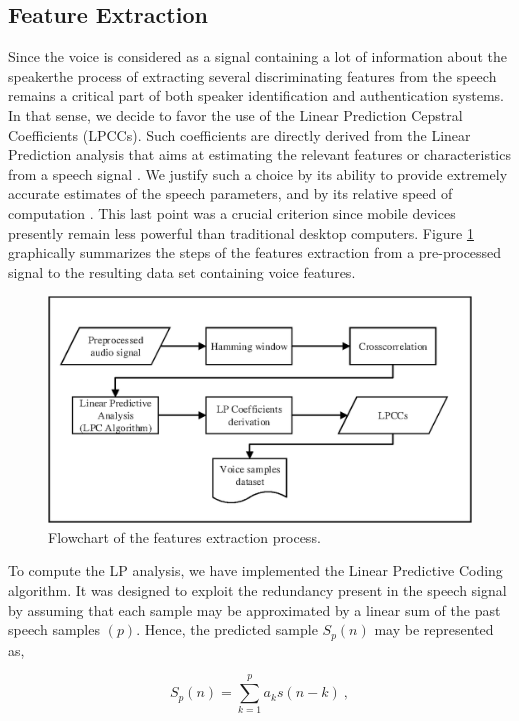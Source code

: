 \documentclass[cryptography,article,submit,moreauthors,pdftex,10pt,a4paper]{mdpi}
\begin{document}
\subsection{Feature Extraction}

Since the voice is considered as a signal containing a lot of information about the speaker\textemdash the process of extracting several discriminating features from the speech remains a critical part of both speaker identification and authentication systems. In that sense, we decide to favor the use of the Linear Prediction Cepstral Coefficients (LPCCs). Such coefficients are directly derived from the Linear Prediction analysis that aims at estimating the relevant features or characteristics from a speech signal \cite{28}. We justify such a choice by its ability to provide extremely accurate estimates of the speech parameters, and by its relative speed of computation \cite{22}. This last point was a crucial criterion since mobile devices presently remain less powerful than traditional desktop computers. Figure \ref{fig:4} graphically summarizes the steps of the features extraction from a pre-processed signal to the resulting data set containing voice features.

\begin{figure}[H]
	\centering
	\includegraphics[width=10 cm]{4.eps}
	\caption{Flowchart of the features extraction process.}
	\label{fig:4}
\end{figure}

To compute the LP analysis, we have implemented the Linear Predictive Coding algorithm. It was designed to exploit the redundancy present in the speech signal by assuming that each sample may be approximated by a linear sum of the past speech samples $(p)$. Hence, the predicted sample $S_p (n)$ may be represented as,

\begin{equation}
\label{eq:3}
  S_p(n) = \sum\limits_{k=1}^{p}a_ks(n-k)~,
\end{equation}
\end{document}
